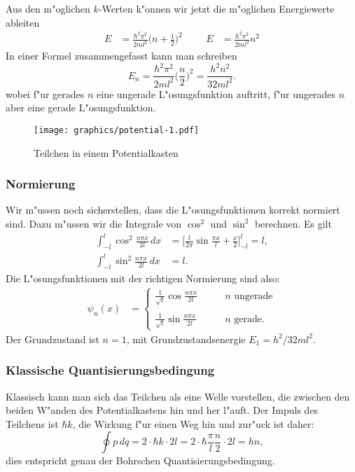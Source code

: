 Aus den m"oglichen $k$-Werten k"onnen wir jetzt die m"oglichen 
Energiewerte ableiten
\begin{align*}
E&=\frac{\hbar^2\pi^2}{2ml^2}\biggl(n+\frac12\biggr)^2
&&&
E&=\frac{\hbar^2\pi^2}{2ml^2}n^2
\end{align*}
In einer Formel zusammengefasst kann man schreiben
\begin{equation}
E_n
=
\frac{\hbar^2\pi^2}{2ml^2}\biggl(\frac{n}{2}\biggr)^2
=
\frac{h^2n^2}{32ml^2}.
\label{skript:potentialkasten-e}
\end{equation}
wobei f"ur gerades $n$ eine ungerade L"osungsfunktion auftritt,
f"ur ungerades $n$ aber eine gerade L"osungsfunktion.
\begin{figure}
\centering
\texttt{[image: graphics/potential-1.pdf]}
\caption{Teilchen in einem Potentialkasten
\label{skript:potentialkasten}}
\end{figure}

\subsubsection{Normierung}
Wir m"ussen noch sicherstellen, dass die L"osungsfunktionen korrekt
normiert sind.
Dazu m"ussen wir die Integrale von $\cos^2$ und $\sin^2$ berechnen.
Es gilt
\begin{align*}
\int_{-l}^l \cos^2\frac{n\pi x}{2l}\,dx
&=
\biggl[
\frac{l}{2\pi}\sin\frac{\pi x}{l}+\frac{x}2
\biggr]_{-l}^l
=l,
\\
\int_{-l}^l \sin^2\frac{n\pi x}{2l}\,dx
&=l.
\end{align*}
Die L"osungsfunktionen mit
der richtigen Normierung sind also:
\begin{align}
\psi_n(x)
&=
\begin{cases}
\displaystyle
\frac{1}{\sqrt{l}}\cos\frac{n \pi x}{2l}&\qquad \text{$n$ ungerade}\\
\\
\displaystyle
\frac{1}{\sqrt{l}}\sin\frac{n \pi x}{2l}&\qquad \text{$n$ gerade}.
\end{cases}
\label{skript:potentialkasten-psi-normiert}
\end{align}
Der Grundzustand ist $n=1$, mit Grundzustandsenergie $E_1=h^2/32ml^2$.

\subsubsection{Klassische Quantisierungsbedingung}
Klassisch kann man sich das Teilchen als eine Welle vorstellen, die
zwischen den beiden W"anden des Potentialkastens hin und her l"auft.
Der Impuls des Teilchens ist $\hbar k$, die Wirkung f"ur einen Weg
hin und zur"uck ist daher:
\[
\oint p\,dq
=
2\cdot \hbar k \cdot 2l = 2\cdot \hbar \frac{\pi}{l}\frac{n}{2}\cdot 2l=hn,
\]
dies entspricht genau der Bohrschen Quantisierungsbedingung.

